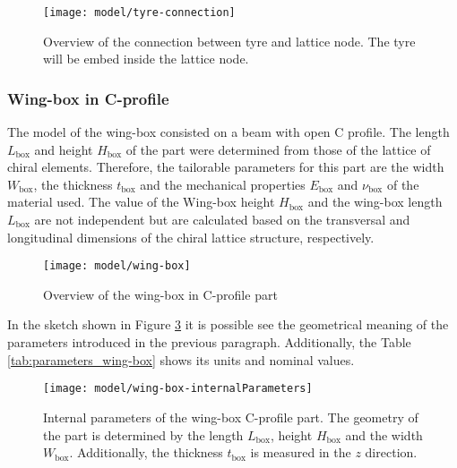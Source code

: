 \begin{figure}[!htpb]
  \centering
  \texttt{[image: model/tyre-connection]}
  \caption[Overview of the connection between tyre and lattice node]{Overview of the connection between tyre and lattice node. The tyre will be embed inside the lattice node.}\label{fig:tyre-connection}
\end{figure}

\clearpage
\subsubsection{Wing-box in C-profile} \label{subsubsec:wingBox_Parametrization}

The model of the wing-box consisted on a beam with open C profile. The length $L_{\mathrm{box}}$ and height $H_{\mathrm{box}}$ of the part were determined from those of the lattice of chiral elements. Therefore, the tailorable parameters for this part are the width $W_{\mathrm{box}}$, the thickness $t_{\mathrm{box}}$ and the mechanical properties $E_{\mathrm{box}}$ and $\nu_{\mathrm{box}}$ of the material used. The value of the Wing-box height $H_{\mathrm{box}}$ and the wing-box length $L_{\mathrm{box}}$ are not independent but are calculated based on the transversal and longitudinal dimensions of the chiral lattice structure, respectively.

\begin{figure}[!htpb]
  \centering
  \texttt{[image: model/wing-box]}
  \caption[Overview of the wing-box in C-profile part]{Overview of the wing-box in C-profile part}\label{fig:wing-box}
\end{figure}

In the sketch shown in Figure \ref{fig:wing-box-internalParameters} it is possible see the geometrical meaning of the parameters introduced in the previous paragraph. Additionally, the Table \ref{tab:parameters_wing-box} shows its units and nominal values.

\begin{figure}[!htpb]
  \centering
  \texttt{[image: model/wing-box-internalParameters]}
  \caption[Internal parameters of the wing-box in C-profile part]{Internal parameters of the wing-box C-profile part. The geometry of the part is determined by the length $L_{\mathrm{box}}$, height $H_{\mathrm{box}}$ and the width $W_{\mathrm{box}}$. Additionally, the thickness $t_{\mathrm{box}}$ is measured in the $z$ direction.}\label{fig:wing-box-internalParameters}
\end{figure}

